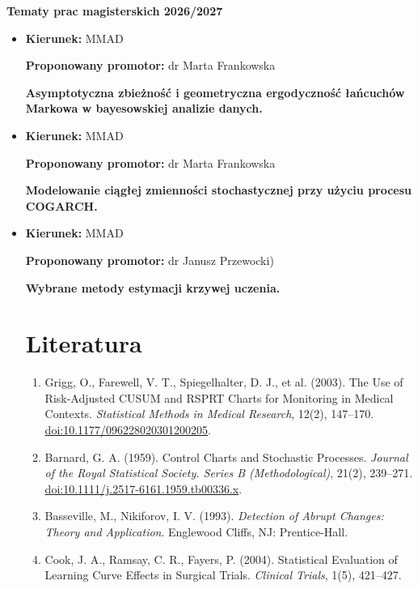 \documentclass[12pt,a4paper]{article}
\begin{document}
\begin{center} \bf Tematy prac magisterskich 2026/2027 \end{center}
\begin{itemize}
\item
\textbf{Kierunek:} MMAD

\noindent
\textbf{Proponowany promotor:} dr Marta Frankowska

\bigskip
  \textbf{Asymptotyczna zbieżność i geometryczna ergodyczność
  łańcuchów Markowa w bayesowskiej analizie danych.}

\item
\textbf{Kierunek:} MMAD

\noindent
\textbf{Proponowany promotor:} dr Marta Frankowska

\bigskip

  \textbf{Modelowanie ciągłej zmienności stochastycznej przy użyciu procesu
COGARCH.}

\item
\textbf{Kierunek:} MMAD

\noindent
\textbf{Proponowany promotor:} dr Janusz Przewocki)
  
\bigskip
\textbf{Wybrane metody estymacji krzywej uczenia.}

\section*{Literatura}

\begin{enumerate}
    \item Grigg, O., Farewell, V. T., Spiegelhalter, D. J., et al. (2003).
    The Use of Risk-Adjusted CUSUM and RSPRT Charts for Monitoring in Medical Contexts.
    \textit{Statistical Methods in Medical Research}, 12(2), 147--170.
    \href{https://doi.org/10.1177/096228020301200205}{doi:10.1177/096228020301200205}.

    \item Barnard, G. A. (1959).
    Control Charts and Stochastic Processes.
    \textit{Journal of the Royal Statistical Society. Series B (Methodological)},
    21(2), 239--271.
    \href{https://doi.org/10.1111/j.2517-6161.1959.tb00336.x}
    {doi:10.1111/j.2517-6161.1959.tb00336.x}.

    \item Basseville, M., Nikiforov, I. V. (1993).
    \textit{Detection of Abrupt Changes: Theory and Application}.
    Englewood Cliffs, NJ: Prentice-Hall.

    \item Cook, J. A., Ramsay, C. R., Fayers, P. (2004).
    Statistical Evaluation of Learning Curve Effects in Surgical Trials.
    \textit{Clinical Trials}, 1(5), 421--427.


\end{enumerate}
\end{itemize}
\end{document}

